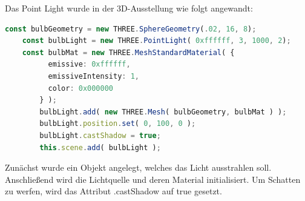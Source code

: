 Das Point Light wurde in der 3D-Ausstellung wie folgt angewandt:  
\begin{lstlisting}[caption={Lichtsetzung in der 3D-Ausstellung},language=TypeScript,label=lst:impl:pointlight]
    const bulbGeometry = new THREE.SphereGeometry(.02, 16, 8);
    const bulbLight = new THREE.PointLight( 0xffffff, 3, 1000, 2); 
    const bulbMat = new THREE.MeshStandardMaterial( {
          emissive: 0xffffff,
          emissiveIntensity: 1,
          color: 0x000000
        } );
        bulbLight.add( new THREE.Mesh( bulbGeometry, bulbMat ) );
        bulbLight.position.set( 0, 100, 0 );
        bulbLight.castShadow = true;
        this.scene.add( bulbLight );
\end{lstlisting}
Zunächst wurde ein Objekt angelegt, welches das Licht ausstrahlen soll. Anschließend wird die Lichtquelle und deren Material initialisiert. Um Schatten zu werfen, wird das Attribut .castShadow auf true gesetzt. 

